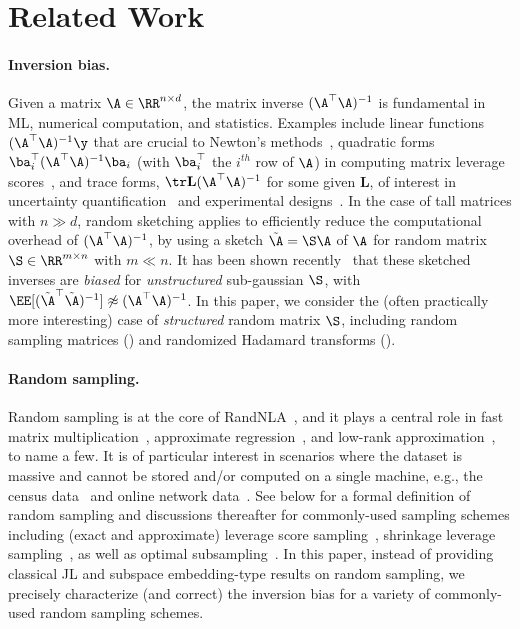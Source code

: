 \section{Related Work}
\label{subsec:related}



\paragraph{Inversion bias.}  
Given a matrix $\A \in \RR^{n \times d}$, the matrix inverse $(\A^\top\A)^{-1}$ is fundamental in ML, numerical computation, and statistics.  
Examples include linear functions $(\A^\top\A)^{-1}\y$ that are crucial to Newton's methods~\citep{boyd2004convex}, quadratic forms $\ba_i^\top(\A^\top\A)^{-1}\ba_i$ (with $\ba^\top_i$ the $i^{th}$ row of $\A$) in computing matrix leverage scores~\citep{drineas2012fast}, and trace forms, $\tr \mathbf{L} (\A^\top\A)^{-1} $ for some given $\mathbf{L}$, of interest in uncertainty quantification~\citep{kalantzis2013Accelerating} and experimental designs~\citep{pukelsheim2006optimal}.  
In the case of tall matrices with $n\gg d$, random sketching applies to efficiently reduce the computational overhead of $(\A^\top\A)^{-1}$, by using a sketch $\tilde\A=\S\A$ of $\A$ for random matrix $\S\in\RR^{m\times n}$ with $m\ll n$. 
It has been shown recently~\citep{michal2020precise,derezinski2021newtonless,derezinski2021sparse} that these sketched inverses are \emph{biased} for \emph{unstructured} sub-gaussian $\S$, with $\EE[(\tilde \A^\top\tilde \A)^{-1}] \not \approx (\A^\top\A)^{-1}$. 
In this paper, we consider the (often practically more interesting) case of \emph{structured} random matrix $\S$, including random sampling matrices () and randomized Hadamard transforms ().


\paragraph{Random sampling.}
Random sampling is at the core of RandNLA~\citep{drineas2006fast1,mahoney2011randomized,ma2015statistical,DM16_CACM,DM21_NoticesAMS,randnla_kdd24_TR}, and it plays a central role in fast matrix multiplication~\citep{drineas2006fast1}, approximate regression~\citep{drineas2006sampling}, and low-rank approximation~\citep{cohen2017input}, to name a few. 
It is of particular interest in scenarios where the dataset is massive and cannot be stored and/or computed on a single machine, e.g., the census data~\citep{wang2018optimal} and online network data~\citep{deng2024subsampling}.
See  below for a formal definition of random sampling and discussions thereafter for commonly-used sampling schemes including (exact and approximate) leverage score sampling~\citep{mahoney2011randomized,cohen2017input}, shrinkage leverage sampling~\citep{ma2015statistical}, as well as optimal subsampling~\citep{wang2018optimal,wang2021optimal,yu2022optimal,ma2022asymptotic}. 
In this paper, instead of providing classical JL and subspace embedding-type results on random sampling, we precisely characterize (and correct) the inversion bias for a variety of commonly-used random sampling schemes.
 


